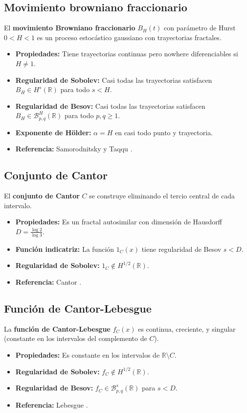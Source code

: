 \documentclass[12pt]{book}
\newcommand{\bes}{\mathcal{B}}
\newcommand{\R}{\mathbb{R}}
\theoremstyle{definition}
\theoremstyle{plain}
\theoremstyle{remark}
\begin{document}
\subsection{Movimiento browniano fraccionario}
El \textbf{movimiento Browniano fraccionario} \(B_H(t)\) con parámetro de Hurst \(0 < H < 1\) es un proceso estocástico gaussiano con trayectorias fractales.
\begin{itemize}
    \item \textbf{Propiedades:} Tiene trayectorias continuas pero nowhere diferenciables si \(H \neq 1\).
    \item \textbf{Regularidad de Sobolev:} Casi todas las trayectorias satisfacen \(B_H \in H^s(\R)\) para todo \(s < H\).
    \item \textbf{Regularidad de Besov:} Casi todas las trayectorias satisfacen \(B_H \in \bes_{p,q}^H(\R)\) para todo \(p, q \geq 1\).
    \item \textbf{Exponente de Hölder:} \(\alpha = H\) en casi todo punto y trayectoria.
    \item \textbf{Referencia:} Samorodnitsky y Taqqu \cite{samorodnitsky1994}.
\end{itemize}

\subsection{Conjunto de Cantor}
El \textbf{conjunto de Cantor} \(C\) se construye eliminando el tercio central de cada intervalo.
\begin{itemize}
    \item \textbf{Propiedades:} Es un fractal autosimilar con dimensión de Hausdorff \(D = \frac{\log 2}{\log 3}\).
    \item \textbf{Función indicatriz:} La función \(\mathrm{1}_C(x)\) tiene regularidad de Besov \(s < D\).
    \item \textbf{Regularidad de Sobolev:} \(\mathrm{1}_C \notin H^{1/2}(\R)\).
    \item \textbf{Referencia:} Cantor \cite{cantor1883}.
\end{itemize}

\subsection{Función de Cantor-Lebesgue}
La \textbf{función de Cantor-Lebesgue} \(f_C(x)\) es continua, creciente, y singular (constante en los intervalos del complemento de \(C\)).
\begin{itemize}
    \item \textbf{Propiedades:} Es constante en los intervalos de \(\R \setminus C\).
    \item \textbf{Regularidad de Sobolev:} \(f_C \notin H^{1/2}(\R)\).
    \item \textbf{Regularidad de Besov:} \(f_C \in \bes_{p,q}^s(\R)\) para \(s < D\).
    \item \textbf{Referencia:} Lebesgue \cite{lebesgue1904}.
\end{itemize}
\end{document}
